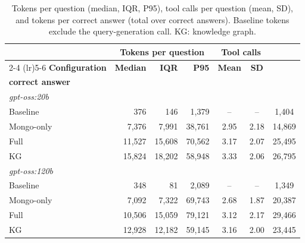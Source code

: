 \begin{table}[t]
\centering
\footnotesize
\setlength{\tabcolsep}{3pt}
\caption{Tokens per question (median, IQR, P95), tool calls per question (mean, SD), and tokens per correct answer (total over correct answers). Baseline tokens exclude the query-generation call. KG: knowledge graph.}
\label{tab:cost-results}
\begin{tabular}{lrrrcc@{\hspace{6pt}}c}
\toprule
 & \multicolumn{3}{c}{\textbf{Tokens per question}} & \multicolumn{2}{c}{\textbf{Tool calls}} & \\
\cmidrule(lr){2-4} \cmidrule(lr){5-6}
\textbf{Configuration} & \textbf{Median} & \textbf{IQR} & \textbf{P95} & \textbf{Mean} & \textbf{SD} & \shortstack{\textbf{Tokens per}\\\textbf{correct answer}} \\
\midrule
\multicolumn{7}{l}{\textit{gpt-oss:20b}} \\
Baseline   & 376    & 146     & 1{,}379  & -- & -- & 1{,}404  \\
Mongo-only   & 7{,}376    & 7{,}991     & 38{,}761  & 2.95 & 2.18 & 14{,}869  \\
Full   & 11{,}527    & 15{,}608     & 70{,}562  & 3.17 & 2.07 & 25{,}495  \\
KG   & 15{,}824    & 18{,}202     & 58{,}948  & 3.33 & 2.06 & 26{,}795  \\
\midrule
\multicolumn{7}{l}{\textit{gpt-oss:120b}} \\
Baseline   & 348    & 81     & 2{,}089  & -- & -- & 1{,}349  \\
Mongo-only   & 7{,}092    & 7{,}322     & 69{,}743  & 2.68 & 1.87 & 20{,}387  \\
Full   & 10{,}506    & 15{,}059     & 79{,}121  & 3.12 & 2.17 & 29{,}466  \\
KG   & 12{,}928    & 12{,}182     & 59{,}145  & 3.16 & 2.00 & 23{,}445  \\
\bottomrule
\end{tabular}
\end{table}
